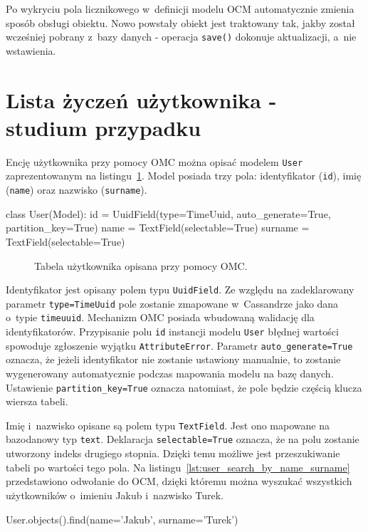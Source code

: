 Po wykryciu pola licznikowego w~definicji modelu OCM automatycznie zmienia sposób obsługi obiektu. Nowo powstały obiekt jest traktowany tak, jakby został wcześniej pobrany z~bazy danych - operacja \verb+save()+ dokonuje aktualizacji, a~nie wstawienia. 

\section{Lista życzeń użytkownika - studium przypadku}

Encję użytkownika przy pomocy OMC można opisać modelem \verb+User+ zaprezentowanym na listingu~\ref{lst:omc_user_definition}. Model posiada trzy pola: identyfikator (\verb+id+), imię (\verb+name+) oraz nazwisko (\verb+surname+).

\begin{verbbox}
class User(Model):
    id = UuidField(type=TimeUuid, auto_generate=True, partition_key=True)
    name = TextField(selectable=True)
    surname = TextField(selectable=True)
\end{verbbox}

\begin{figure}[ht!]
	\centering
	\theverbbox
	\caption{Tabela użytkownika opisana przy pomocy OMC.}
	\label{lst:omc_user_definition}
\end{figure}

Identyfikator jest opisany polem typu \verb+UuidField+. Ze względu na zadeklarowany parametr \verb+type=TimeUuid+ pole zostanie zmapowane w~Cassandrze jako dana o~typie \verb+timeuuid+. Mechanizm OMC posiada wbudowaną walidację dla identyfikatorów. Przypisanie polu \verb+id+ instancji modelu \verb+User+ błędnej wartości spowoduje zgłoszenie wyjątku \verb+AttributeError+. Parametr \verb+auto_generate=True+ oznacza, że jeżeli identyfikator nie zostanie ustawiony manualnie, to zostanie wygenerowany automatycznie podczas mapowania modelu na bazę danych. Ustawienie \verb+partition_key=True+ oznacza natomiast, że pole będzie częścią klucza wiersza tabeli. 

Imię i~nazwisko opisane są polem typu \verb+TextField+. Jest ono mapowane na bazodanowy typ \verb+text+. Deklaracja \verb+selectable=True+ oznacza, że na polu zostanie utworzony indeks drugiego stopnia. Dzięki temu możliwe jest przeszukiwanie tabeli po wartości tego pola. Na listingu~\ref{lst:user_search_by_name_surname} przedstawiono odwołanie do OCM, dzięki któremu można wyszukać wszystkich użytkowników o~imieniu Jakub i~nazwisko Turek.

\begin{verbbox}
	User.objects().find(name='Jakub', surname='Turek')
\end{verbbox}

